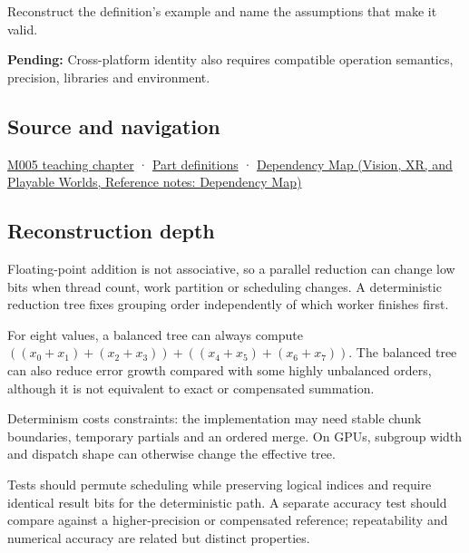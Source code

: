 Reconstruct the definition's example and name the assumptions that make it valid.

\textbf{Pending:} Cross-platform identity also requires compatible operation semantics, precision, libraries and environment.

\subsection{Source and navigation}\label{appendix-4c8e0238e7ee-source-and-navigation}

\hyperref[01-foundations-i-ch001-when-arithmetic-meets-uncertainty]{M005 teaching chapter} · \hyperref[appendix-fd090d982a15-m005---parts-77-88]{Part definitions} · \href{../07-Vision-XR-and-Playable-Worlds/main.pdf\#nameddest=appendix-4ad47bdd269a}{Dependency Map (Vision, XR, and Playable Worlds, Reference notes: Dependency Map)}

\subsection{Reconstruction depth}\label{appendix-4c8e0238e7ee-reconstruction-depth}

Floating-point addition is not associative, so a parallel reduction can change low bits when thread count, work partition or scheduling changes. A deterministic reduction tree fixes grouping order independently of which worker finishes first.

For eight values, a balanced tree can always compute \(((x_0+x_1)+(x_2+x_3)) + ((x_4+x_5)+(x_6+x_7))\). The balanced tree can also reduce error growth compared with some highly unbalanced orders, although it is not equivalent to exact or compensated summation.

Determinism costs constraints: the implementation may need stable chunk boundaries, temporary partials and an ordered merge. On GPUs, subgroup width and dispatch shape can otherwise change the effective tree.

Tests should permute scheduling while preserving logical indices and require identical result bits for the deterministic path. A separate accuracy test should compare against a higher-precision or compensated reference; repeatability and numerical accuracy are related but distinct properties.
